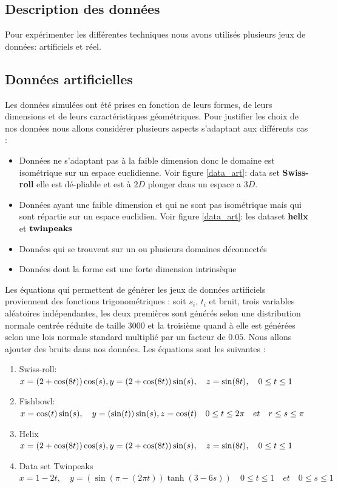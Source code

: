 \documentclass[twoside,twocolumn]{article}
\begin{document}
\begin{itemize}
\section{Description des données}
Pour expérimenter les différentes techniques nous avons utilisés plusieurs jeux de données: artificiels et réel. 
\subsection{Données artificielles}
Les données simulées ont été prises en fonction de leurs formes, de leurs dimensions et de leurs caractéristiques géométriques. Pour justifier les choix de nos données nous allons considérer plusieurs aspects s’adaptant aux différents cas \cite{Maaten08}:
\begin{itemize}
\item Données ne s’adaptant pas à la faible dimension donc le domaine est isométrique sur un espace euclidienne. Voir figure \ref{data_art}: data set { \bf Swiss-roll}  elle est dé-pliable et est à $2D$ plonger dans un espace a $3D$. 
\item Données ayant une faible dimension et qui ne sont pas isométrique mais qui sont répartie sur un espace euclidien. Voir figure \ref{data_art}: les dataset $ \bf helix$ et $ \bf twin peaks $
\item Données qui se trouvent sur un ou plusieurs domaines déconnectés
\item Données dont la forme est une forte dimension intrinsèque
\end{itemize}

Les équations qui permettent de générer les jeux de données artificiels proviennent des fonctions trigonométriques : soit $s_i$, $t_i$ et bruit, trois variables aléatoires indépendantes, les deux premières sont générés selon  une distribution normale centrée réduite de taille $3000$ et la troisième quand à elle est générées selon une lois normale standard multiplié par un facteur de $0.05$. Nous allons ajouter des bruits dans nos données. Les équations sont les suivantes \cite{Maaten08} \cite{Wang12}: 
\end{itemize}

\begin{enumerate}
\item  Swiss-roll: $\mathbf{}x = (2+\cos(8t))\cos(s), \\y = (2+\cos(8t))\sin(s), \quad
z = \sin (8t),\quad  0\le t \le1 $

\item  Fishbowl: $\mathbf{}x = \cos(t)\sin(s), \quad
y = (\sin(t))\sin(s),\\ z =\cos (t) \quad 0\le t \le 2\pi \quad et \quad r \le  s \le \pi $ 

\item  Helix
    $ \mathbb{} x = (2+\cos(8t))\cos(s), \\ y = (2 +\cos(8t))\sin(s), \quad z = \sin (8t), \quad  0\le t  \le 1$  
   
\item Data set Twinpeaks
$\mathbf{} x = 1 -2t, \quad y = (\sin (\pi - (2 \pi t)) \tanh(3-6s)) \quad 0\le t \le 1 \quad et \quad  0\le s  \le 1 $  

\end{enumerate}
\end{document}
